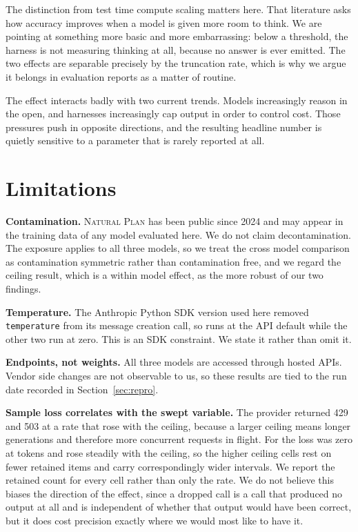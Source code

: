 \documentclass[10pt,twocolumn]{article}
\begin{document}
The distinction from test time compute scaling \cite{snell2024scaling} matters
here. That literature asks how accuracy improves when a model is given more room
to think. We are pointing at something more basic and more embarrassing: below a
threshold, the harness is not measuring thinking at all, because no answer is
ever emitted. The two effects are separable precisely by the truncation rate,
which is why we argue it belongs in evaluation reports as a matter of routine.

The effect interacts badly with two current trends. Models increasingly reason
in the open, and harnesses increasingly cap output in order to control cost.
Those pressures push in opposite directions, and the resulting headline number
is quietly sensitive to a parameter that is rarely reported at all.

\section{Limitations}
\label{sec:limitations}

\textbf{Contamination.} \textsc{Natural Plan} has been public since 2024 and may
appear in the training data of any model evaluated here. We do not claim
decontamination. The exposure applies to all three models, so we treat the cross
model comparison as contamination symmetric rather than contamination free, and
we regard the ceiling result, which is a within model effect, as the more robust
of our two findings.

\textbf{Temperature.} The Anthropic Python SDK version used here removed
\texttt{temperature} from its message creation call, so \claudeName{} runs at the
API default while the other two run at zero. This is an SDK constraint. We state
it rather than omit it.

\textbf{Endpoints, not weights.} All three models are accessed through hosted
APIs. Vendor side changes are not observable to us, so these results are tied to
the run date recorded in Section~\ref{sec:repro}.

\textbf{Sample loss correlates with the swept variable.} The provider returned
429 and 503 at a rate that rose with the ceiling, because a larger ceiling means
longer generations and therefore more concurrent requests in flight. For
\nemotronName{} the loss was zero at \tokenLowBudget{} tokens and rose steadily
with the ceiling, so the higher ceiling cells rest on fewer retained items and
carry correspondingly wider intervals. We report the retained count for every
cell rather than only the rate. We do not believe this biases the direction of
the effect, since a dropped call is a call that produced no output at all and is
independent of whether that output would have been correct, but it does cost
precision exactly where we would most like to have it.
\end{document}

